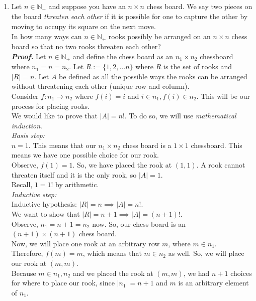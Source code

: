 \documentclass[11pt,a4paper]{article}
\begin{document}
\begin{enumerate}
    \item 
    Let $n \in \mathbb{N}_+$ and suppose you have an $n \times n$ chess board. We say two pieces on the board \emph{threaten each other} if it is possible for one to capture the other by moving to occupy its square on the next move. \bigskip \\
    In how many ways can $n \in \mathbb{N}_+ $ rooks possibly be arranged on an $n \times n$ chess board so that no two rooks threaten each other? \\
    \emph{\textbf{Proof.}} Let $n \in \mathbb{N}_+ $ and define the chess board as an $n_1 \times n_2 $ chessboard where $n_1 = n = n_2 $. 
    Let $R := \{1, 2, \dots n \} $ where $R$ is the set of rooks and $|R| = n$. Let $A$ be defined as all the possible ways the rooks can be arranged without threatening each other (unique row and column). \\
    Consider $f: n_1 \rightarrow n_2 $ where $f(i) = i $ and $i \in n_1, f(i) \in n_2$. This will be our process for placing rooks. \\
    We would like to prove that $|A| = n! $. To do so, we will use \emph{mathematical induction}. \\
    \emph{Basis step:} \\
    $n = 1$. This means that our $n_1 \times n_2 $ chess board is a $1 \times 1 $ chessboard. This means we have one possible choice for our rook. \\
    Observe, $f(1) = 1 $. So, we have placed the rook at $(1, 1) $. A rook cannot threaten itself and it is the only rook, so $|A| = 1 $. \\
    Recall, $1 = 1!$ by arithmetic.  \\
    \emph{Inductive step:} \\
    Inductive hypothesis: $|R| = n \implies |A| = n! $. \\
    We want to show that $|R| = n + 1 \implies |A| = (n + 1)! $. \\
    Observe, $n_1 = n + 1 = n_2 $ now. So, our chess board is an $(n + 1) \times (n + 1) $ chess board. \\
    Now, we will place one rook at an arbitrary row $m $, where $m \in n_1 $. \\
    Therefore, $f(m) = m $, which means that $m \in n_2 $ as well. So, we will place our rook at $(m, m) $. \\
    Because $m \in n_1, n_2$ and we placed the rook at $(m, m) $, we had $n + 1$ choices for where to place our rook, since $|n_1| = n + 1 $ and $m $ is an arbitrary element of $n_1$. \\

\end{enumerate}
\end{document}
